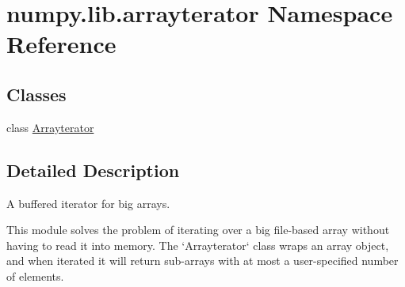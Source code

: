 \hypertarget{namespacenumpy_1_1lib_1_1arrayterator}{}\section{numpy.\+lib.\+arrayterator Namespace Reference}
\label{namespacenumpy_1_1lib_1_1arrayterator}
\subsection*{Classes}
\begin{DoxyCompactItemize}
\item 
class \hyperlink{classnumpy_1_1lib_1_1arrayterator_1_1Arrayterator}{Arrayterator}
\end{DoxyCompactItemize}


\subsection{Detailed Description}
\begin{DoxyVerb}A buffered iterator for big arrays.

This module solves the problem of iterating over a big file-based array
without having to read it into memory. The `Arrayterator` class wraps
an array object, and when iterated it will return sub-arrays with at most
a user-specified number of elements.\end{DoxyVerb}
 